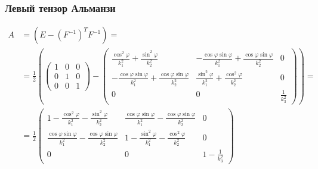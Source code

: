 \documentclass[14pt,a4paper]{scrartcl}
\begin{document}
\subsubsection*{Левый тензор Альманзи}

\begin{align*}
	A&=\left(E-\left(F^{-1}\right)^{T} F^{-1}\right)=\\
	&= \frac{1}{2}\left(\left(\begin{array}{ccc}
	1 & 0 & 0 \\
	0 & 1 & 0 \\
	0 & 0 & 1
	\end{array}\right)-\left(\begin{array}{ccc}
	\frac{\cos ^{2} \varphi}{k_{1}^{2}}+\frac{\sin ^{2} \varphi}{k_{2}^{2}} & -\frac{\cos \varphi \sin \varphi}{k_{1}^{2}}+\frac{\cos \varphi \sin \varphi}{k_{2}^{2}} & 0 \\
	-\frac{\cos \varphi \sin \varphi}{k_{1}^{2}}+\frac{\cos \varphi \sin \varphi}{k_{2}^{2}} & \frac{\sin ^{2} \varphi}{k_{1}^{2}}+\frac{\cos ^{2} \varphi}{k_{2}^{2}} & 0 \\
	0 & 0 & \frac{1}{k_{3}^{2}}
	\end{array}\right)\right) = \\
	&= \frac{1}{2}\left(\begin{array}{ccc}
	1-\frac{\cos ^{2} \varphi}{k_{1}^{2}}-\frac{\sin ^{2} \varphi}{k_{2}^{2}} & \frac{\cos \varphi \sin \varphi}{k_{1}^{2}}-\frac{\cos \varphi \sin \varphi}{k_{2}^{2}} & 0 \\
	\frac{\cos \varphi \sin \varphi}{k_{1}^{2}}-\frac{\cos \varphi \sin \varphi}{k_{2}^{2}} & 1-\frac{\sin ^{2} \varphi}{k_{1}^{2}}-\frac{\cos ^{2} \varphi}{k_{2}^{2}} & 0 \\
	0 & 0 & 1-\frac{1}{k_{3}^{2}}
	\end{array}\right)
\end{align*}
\end{document}
